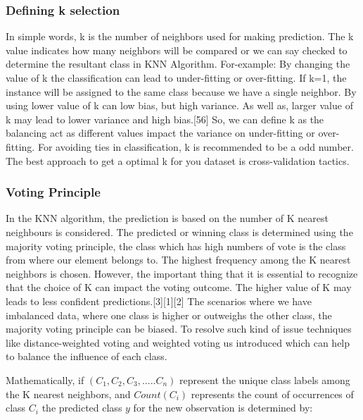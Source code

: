 \documentclass[conference]{IEEEtran}
\begin{document}
\subsubsection{Defining k selection}
In simple words, k is the number of neighbors used for making prediction. The k value indicates how many neighbors will be compared or we can say checked to determine the resultant class in KNN Algorithm. For-example: By changing the value of k the classification can lead to under-fitting or over-fitting. If k=1, the instance will be assigned to the same class because we have a single neighbor. By using lower value of k can low bias, but high variance. As well as, larger value of k may lead to lower variance and high bias.[56] So, we can define k as the balancing act as different values impact the variance on under-fitting or over-fitting. For avoiding ties in classification, k is recommended to be a odd number. The best approach to get a optimal k for you dataset is cross-validation tactics.  


\subsubsection{Voting Principle}
In the KNN algorithm, the prediction is based on the number of K nearest neighbours is considered. The predicted or winning class is determined using the majority voting principle, the class which has high numbers of vote is the class from where our element belongs to. The highest frequency among the K nearest neighbors is chosen. However, the important thing that it is essential to recognize that the choice of K can impact the voting outcome. The higher value of K may leads to less confident predictions.[3][1][2] The scenarios where we have imbalanced data, where one class is higher or outweighs the other class, the majority voting principle can be biased. To resolve such kind of issue techniques like distance-weighted voting and weighted voting us introduced which can help to balance the influence of each class. 

Mathematically, if 
\begin{math}
(C_1,C_2,C_3,.....C_n) 
\end{math}
represent the unique class labels among the K nearest neighbors, and 
\begin{math}
Count(C_i) 
\end{math}
represents the count of occurrences of class 
\begin{math}C_i\end{math}
the predicted class  
\begin{math} y \end{math}
for the new observation is determined by:
\end{document}
